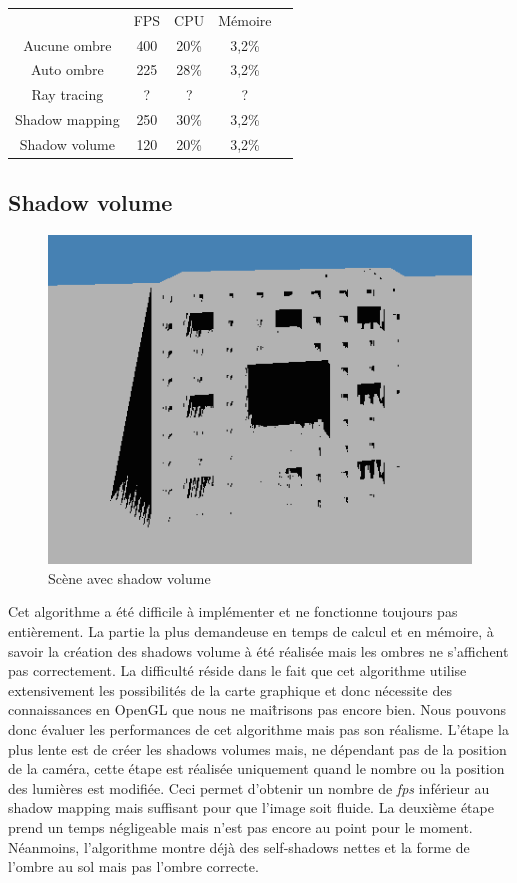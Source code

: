 \documentclass[a4paper,10pt]{report}
\begin{document}
\begin{table}[h]
\centering
\begin{tabular}{|c|c|c|c|l}
\cline{1-4}
 & FPS  & CPU & Mémoire  &  \\ \cline{1-4}
 Aucune ombre& 400 & 20\%  & 3,2\%  &  \\ \cline{1-4}
 Auto ombre& 225 & 28\%  & 3,2\%  &  \\ \cline{1-4}
 Ray tracing& ? & ?  & ?  &  \\ \cline{1-4}
 Shadow mapping& 250  & 30\%  & 3,2\%  &  \\ \cline{1-4}
 Shadow volume& 120  & 20\%  & 3,2\%  &  \\ \cline{1-4}
\end{tabular}
\end{table}

\subsection{Shadow volume}

\begin{figure}[H]
\includegraphics[scale=0.4]{images/shadowvolume.png}
\centering
\caption{Scène avec shadow volume}
\end{figure}

Cet algorithme a été difficile à implémenter et ne fonctionne toujours pas entièrement. La partie la plus demandeuse en temps de calcul et en mémoire, à savoir la création des shadows volume à été réalisée mais les ombres ne s'affichent pas correctement. La difficulté réside dans le fait que cet algorithme utilise extensivement les possibilités de la carte graphique et donc nécessite des connaissances en OpenGL que nous ne mai\^trisons pas encore bien.
Nous pouvons donc évaluer les performances de cet algorithme mais pas son réalisme.
L'étape la plus lente est de créer les shadows volumes mais, ne dépendant pas de la position de la caméra, cette étape est réalisée uniquement quand le nombre ou la position des lumières est modifiée.
Ceci permet d'obtenir un nombre de \textit{fps} inférieur au shadow mapping mais suffisant pour que l'image soit fluide.
La deuxième étape prend un temps négligeable mais n'est pas encore au point pour le moment. Néanmoins, l'algorithme montre déjà des self-shadows nettes et la forme de l'ombre au sol mais pas l'ombre correcte.
\end{document}
